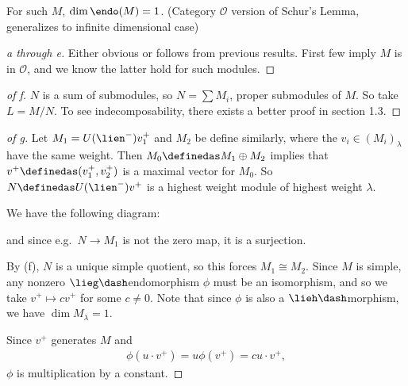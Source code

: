 \begin{remark}

For such \(M\), \(\dim \endo(M) = 1\). (Category \(\mathcal O\) version
of Schur's Lemma, generalizes to infinite dimensional case)

\end{remark}

\begin{proof}[a through e]

Either obvious or follows from previous results. First few imply \(M\)
is in \(\mathcal O\), and we know the latter hold for such modules.

\end{proof}

\begin{proof}[of f]

\(N\) is a sum of submodules, so \(N = \sum M_i\), proper submodules of
\(M\). So take \(L = M/N\). To see indecomposability, there exists a
better proof in section 1.3.

\end{proof}

\begin{proof}[of g]

Let \(M_1 = U(\lien^-)v_1^+\) and \(M_2\) be define similarly, where the
\(v_i \in (M_i)_\lambda\) have the same weight. Then
\(M_0 \definedas M_1 \oplus M_2\) implies that
\(v^+ \definedas (v_1^+, v_2^+)\) is a maximal vector for \(M_0\). So
\(N \definedas U(\lien^-) v^+\) is a highest weight module of highest
weight \(\lambda\).

We have the following diagram:

\begin{center}\end{center}

and since e.g.~\(N \to M_1\) is not the zero map, it is a surjection.

By (f), \(N\) is a unique simple quotient, so this forces
\(M_1 \cong M_2\). Since \(M\) is simple, any nonzero
\(\lieg\dash\)endomorphism \(\phi\) must be an isomorphism, and so we
take \(v^+ \mapsto cv^+\) for some \(c\neq 0\). Note that since \(\phi\)
is also a \(\lieh\dash\)morphism, we have \(\dim M_\lambda = 1\).

Since \(v^+\) generates \(M\) and
\begin{align*}
\phi(u\cdot v^+) = u \phi(v^+) = cu\cdot v^+
,\end{align*} \(\phi\) is multiplication by a constant.

\end{proof}

